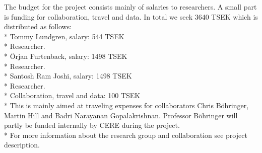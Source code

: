 The budget for the project consists mainly of salaries to researchers. A small part is funding
for collaboration, travel and data. In total we seek 3640 TSEK which is distributed as follows:\\*
Tommy Lundgren, salary: 544 TSEK\\*
Researcher.\\*
Örjan Furtenback, salary: 1498 TSEK\\*
Researcher.\\*
Santosh Ram Joshi, salary: 1498 TSEK\\*
Researcher.\\*
Collaboration, travel and data: 100 TSEK\\*
This is mainly aimed at traveling expenses for collaborators Chris Böhringer, Martin Hill and Badri Narayanan Gopalakrishnan. Professor Böhringer will partly be funded internally by CERE during the project.\\*
For more information about the research group and collaboration see project description.

